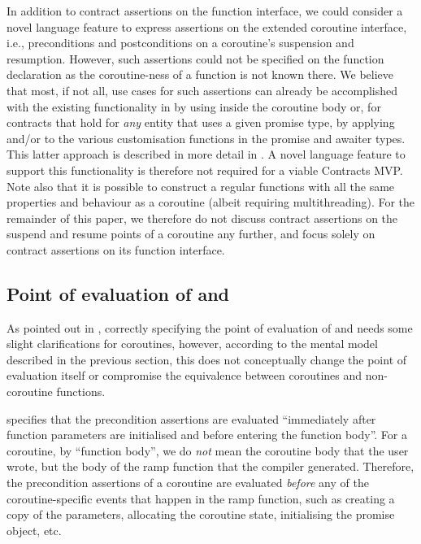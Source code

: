 In addition to contract assertions on the function interface, we could consider a novel language feature to express assertions on the extended coroutine interface, i.e., preconditions and postconditions on a coroutine's suspension and resumption. However, such assertions could not be specified on the function declaration as the coroutine-ness of a function is not known there. We believe that most, if not all, use cases for such assertions can already be accomplished with the existing functionality in \cite{P2900R8} by using  inside the coroutine body or, for contracts that hold for \emph{any} entity that uses a given promise type, by applying  and/or  to the various customisation functions in the promise and awaiter types. This latter approach is described in more detail in \cite{P3251R0}. A novel language feature to support this functionality is therefore not required for a viable Contracts MVP. Note also that it is possible to construct a regular functions with all the same properties and behaviour as a coroutine (albeit requiring multithreading). For the remainder of this paper, we therefore do not discuss contract assertions on the suspend and resume points of a coroutine any further, and focus solely on contract assertions on its function interface.

\subsection{Point of evaluation of  and }

As pointed out in \cite{P2957R1}, correctly specifying the point of evaluation of  and  needs some slight clarifications for coroutines, however, according to the mental model described in the previous section, this does not conceptually change the point of evaluation itself or compromise the equivalence between coroutines and non-coroutine functions.

\cite{P2900R8} specifies that the precondition assertions are evaluated ``immediately after function parameters are initialised and before entering the function body''. For a coroutine, by ``function body'', we do \emph{not} mean the coroutine body that the user wrote, but the body of the ramp function that the compiler generated. Therefore, the precondition assertions of a coroutine are evaluated \emph{before} any of the coroutine-specific events that happen in the ramp function, such as creating a copy of the parameters, allocating the coroutine state, initialising the promise object, etc.

